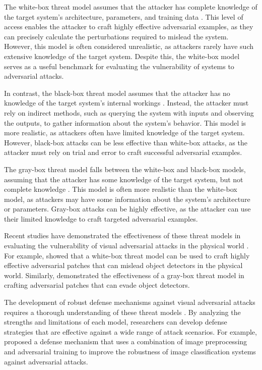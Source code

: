 \documentclass[11pt,a4paper]{article}
\begin{document}
The white-box threat model assumes that the attacker has complete knowledge of the target system's architecture, parameters, and training data \cite{arxiv:1707.08945}. This level of access enables the attacker to craft highly effective adversarial examples, as they can precisely calculate the perturbations required to mislead the system. However, this model is often considered unrealistic, as attackers rarely have such extensive knowledge of the target system. Despite this, the white-box model serves as a useful benchmark for evaluating the vulnerability of systems to adversarial attacks.

In contrast, the black-box threat model assumes that the attacker has no knowledge of the target system's internal workings \cite{doi:10.24963/ijcai.2021/694}. Instead, the attacker must rely on indirect methods, such as querying the system with inputs and observing the outputs, to gather information about the system's behavior. This model is more realistic, as attackers often have limited knowledge of the target system. However, black-box attacks can be less effective than white-box attacks, as the attacker must rely on trial and error to craft successful adversarial examples.

The gray-box threat model falls between the white-box and black-box models, assuming that the attacker has some knowledge of the target system, but not complete knowledge \cite{arxiv:1902.06705}. This model is often more realistic than the white-box model, as attackers may have some information about the system's architecture or parameters. Gray-box attacks can be highly effective, as the attacker can use their limited knowledge to craft targeted adversarial examples.

Recent studies have demonstrated the effectiveness of these threat models in evaluating the vulnerability of visual adversarial attacks in the physical world \cite{doi:10.1007/978-3-030-58589-1_3}. For example, \cite{arxiv:1712.09665} showed that a white-box threat model can be used to craft highly effective adversarial patches that can mislead object detectors in the physical world. Similarly, \cite{arxiv:1906.11897} demonstrated the effectiveness of a gray-box threat model in crafting adversarial patches that can evade object detectors.

The development of robust defense mechanisms against visual adversarial attacks requires a thorough understanding of these threat models \cite{arxiv:1810.00069}. By analyzing the strengths and limitations of each model, researchers can develop defense strategies that are effective against a wide range of attack scenarios. For example, \cite{doi:10.1016/j.cose.2020.102092} proposed a defense mechanism that uses a combination of image preprocessing and adversarial training to improve the robustness of image classification systems against adversarial attacks.
\end{document}
